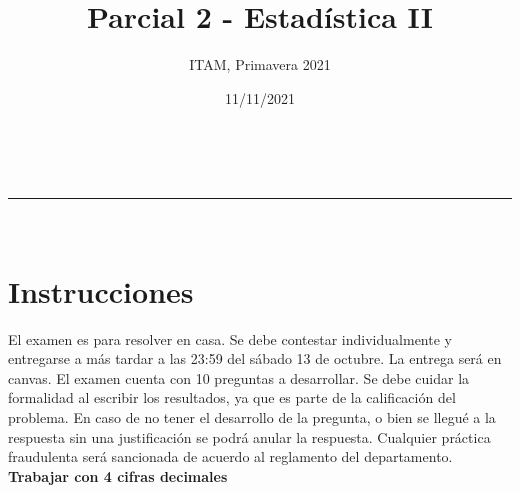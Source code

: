 \documentclass[addpoints]{exam}
\makeatletter
\newcommand{\linia}{\rule{\linewidth}{0.5pt}}
\theoremstyle{mytheor}
\renewcommand{\maketitle}{
    \begin{center}
    \vspace{2ex}
    {\huge \textsc{\@title}}
    \vspace{1ex}
    \\
    \linia\\
    \@author \hfill \@date
    \vspace{4ex}
    \end{center}
  }
\makeatother
\begin{document}
  
  \title{Parcial 2 - Estadística II}
  
  \author{ITAM, Primavera 2021}
  
  \date{11/11/2021}
  
  \maketitle
  
  \section*{Instrucciones}
  
El examen es para resolver en casa. Se debe contestar individualmente y entregarse a más tardar a las 23:59 del sábado 13 de octubre. La entrega será en canvas. El examen cuenta con 10 preguntas a desarrollar. Se debe cuidar la formalidad al escribir los resultados, ya que es parte de la calificación del problema. En caso de no tener el desarrollo de la pregunta, o bien se llegué a la respuesta sin una justificación se podrá anular la respuesta. Cualquier práctica fraudulenta será sancionada de acuerdo al reglamento del departamento. \textbf{Trabajar con 4 cifras decimales}

\vspace{10pt}
\end{document}
